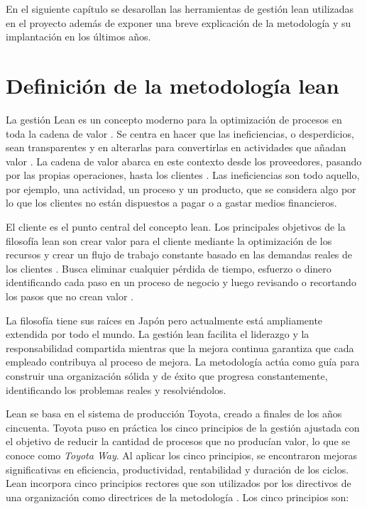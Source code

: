 En el siguiente capítulo se desarollan las herramientas de gestión lean utilizadas en el proyecto además de exponer una breve explicación de la metodología y su implantación en los últimos años.

\section{Definición de la metodología lean}

La gestión Lean es un concepto moderno para la optimización de procesos en toda la cadena de valor \cite{helmold_progress_2019}.
Se centra en hacer que las ineficiencias, o desperdicios, sean transparentes y en alterarlas para convertirlas en actividades que añadan valor \cite{helmold_global_2016}.
La cadena de valor abarca en este contexto desde los proveedores, pasando por las propias operaciones, hasta los clientes \cite{slack_operations_2010}.
Las ineficiencias son todo aquello, por ejemplo, una actividad, un proceso y un producto, que se considera algo por lo que los clientes no están dispuestos a pagar o a gastar medios financieros.

El cliente es el punto central del concepto lean.
Los principales objetivos de la filosofía lean son crear valor para el cliente mediante la optimización de los recursos y crear un flujo de trabajo constante basado en las demandas reales de los clientes \cite{ohno_toyota_1988}. Busca eliminar cualquier pérdida de tiempo, esfuerzo o dinero identificando cada paso en un proceso de negocio y luego revisando o recortando los pasos que no crean valor \cite{bertagnolli_lean_2018}.

La filosofía tiene sus raíces en Japón pero actualmente está ampliamente extendida por todo el mundo.
La gestión lean facilita el liderazgo y la responsabilidad compartida mientras que la mejora continua garantiza que cada empleado contribuya al proceso de mejora.
La metodología actúa como guía para construir una organización sólida y de éxito que progresa constantemente, identificando los problemas reales y resolviéndolos.

Lean se basa en el sistema de producción Toyota, creado a finales de los años cincuenta.
Toyota puso en práctica los cinco principios de la gestión ajustada con el objetivo de reducir la cantidad de procesos que no producían valor, lo que se conoce como \textit{Toyota Way}.
Al aplicar los cinco principios, se encontraron mejoras significativas en eficiencia, productividad, rentabilidad y duración de los ciclos.
Lean incorpora cinco principios rectores que son utilizados por los directivos de una organización como directrices de la metodología \cite{helmold_progress_2019}. Los cinco principios son:

